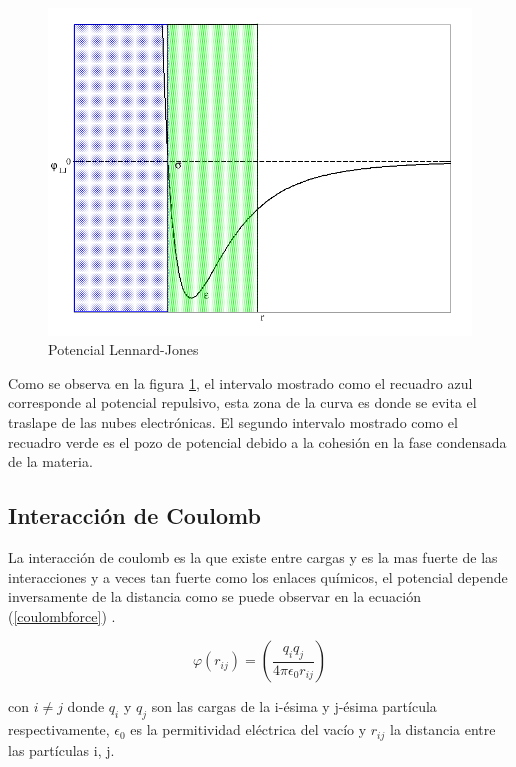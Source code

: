 \begin{figure}[!h]
    \centering
    \includegraphics[width=.7\textwidth,keepaspectratio=true]{StatMech/LJfig.png}
    \caption{Potencial Lennard-Jones}
    \label{fig:LJ126}
\end{figure}

Como se observa en la figura \ref{fig:LJ126}, el intervalo mostrado como el recuadro azul corresponde al potencial repulsivo, esta zona de la curva es donde se evita el traslape de las nubes electrónicas. El segundo intervalo mostrado como el recuadro verde es el pozo de potencial debido a la cohesión en la fase condensada de la materia.\\

\subsection{Interacción de Coulomb}

La interacción de coulomb es la que existe entre cargas y es la mas fuerte de las interacciones y a veces tan fuerte como los enlaces químicos, el potencial depende inversamente de la distancia como se puede observar en la ecuación (\ref{coulombforce}) \cite{ISRAELACHVILI201153}.

\begin{equation} \label{coulombforce}
    \varphi(r_{ij}) = \left(\frac{q_i q_j}{4\pi \epsilon_{0} r_{ij}}\right)
\end{equation}

con $i\neq j$ donde $q_i$ y $q_j$ son las cargas de la i-ésima y j-ésima partícula respectivamente, $\epsilon_0$ es la permitividad eléctrica del vacío y $r_{ij}$ la distancia entre las partículas i, j. 



